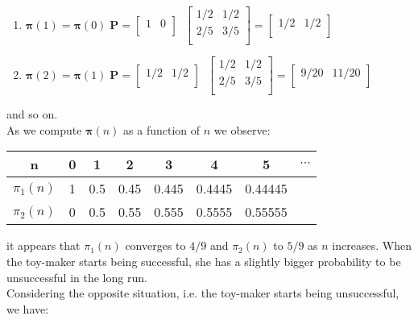 \documentclass[../main.tex]{subfiles}
\begin{document}
\begin{small}
\begin{enumerate}
    \item $\bm{\pi}(1) = \bm{\pi}(0) \; \mathbf{P} = 
  \begin{bmatrix}
    1 & 0\\
  \end{bmatrix}
 \; \;   \begin{bmatrix}
1/2 & 1/2\\
2/5 & 3/5\\
  \end{bmatrix} = \begin{bmatrix}
    1/2 & 1/2\\
  \end{bmatrix}$
  \item $\bm{\pi}(2) = \bm{\pi}(1) \; \mathbf{P} = 
  \begin{bmatrix}
    1/2 & 1/2\\
  \end{bmatrix}
 \; \;
 \begin{bmatrix}
    1/2 & 1/2\\
    2/5 & 3/5\\
  \end{bmatrix} = \begin{bmatrix}
    9/20 & 11/20\\
  \end{bmatrix}$
\end{enumerate}
and so on.\\

\noindent As we compute $\bm{\pi}(n)$ as a function of $n$ we observe:

\begin{center} 
\begin{tabular}{ c|c|c|c|c|c|c|c  } 
 n & 0 & 1 & 2 & 3& 4 & 5 &$\cdots$ \\ 
  \hline
 $\pi_1(n)$ & 1& 0.5& 0.45& 0.445& 0.4445&0.44445 \\ 
 $\pi_2(n)$  & 0 & 0.5  & 0.55&0.555 &0.5555&0.55555\\ 
\end{tabular}
\end{center}
it appears that $\pi_1(n)$ converges to $4/9$ and $\pi_2(n)$ to $5/9$ as $n$ increases. When the toy-maker starts being successful, she has a slightly bigger probability to be unsuccessful in the long run.  \\

\noindent Considering the opposite situation, i.e. the toy-maker starts being unsuccessful, we have:


\end{small}
\end{document}

